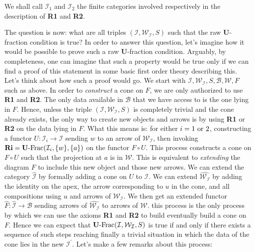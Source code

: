 \documentclass{article}
\numberwithin{equation}{section}
\theoremstyle{definition}
\theoremstyle{plain}
\begin{document}
We shall call $\mathcal{I}_1$ and $\mathcal{I}_2$ the finite categories involved respectively in the description of \textbf{R1} and \textbf{R2}.

The question is now: what are all triples $(\mathcal{I}, \mathcal{W}_{\mathcal{I}}, S)$ such that the raw \textbf{U}-fraction condition is true? In order to answer this question, let's imagine how it would be possible to prove such a raw \textbf{U}-fraction condition. Arguably, by completeness, one can imagine that such a property would be true only if we can find a proof of this statement in some basic first order theory describing this. Let's think about how such a proof would go. We start with $\mathcal{I}, \mathcal{W}_{\mathcal{I}}, S, \mathcal{B}, \mathcal{W}, F$ such as above. In order to \textit{construct} a cone on $F$, we are only authorized to use \textbf{R1} and \textbf{R2}. The only data available in $\mathcal{B}$ that we have access to is the one lying in $F$. Hence, unless the triple $(\mathcal{I}, \mathcal{W}_{\mathcal{I}}, S)$ is completely trivial and the cone already exists, the only way to create new objects and arrows is by using \textbf{R1} or \textbf{R2} on the data lying in $F$. What this means is: for either $i = 1 \textnormal{ or } 2$, constructing a functor $U:\mathcal{I}_i \to \mathcal{I}$ sending $w$ to an arrow of $\mathcal{W}_{\mathcal{I}}$, then invoking $\textbf{Ri}=\textnormal{\textbf{U}-Frac}(\mathcal{I}_i, \{w\}, \{a\})$ on the functor $F\circ U$. This process constructs a cone on $F\circ U$ such that the projection at $a$ is in $\mathcal{W}$. This is equivalent to \textit{extending} the diagram $F$ to include this new object and those new arrows. We can extend the category $\widehat{\mathcal{I}}$ by formally adding a cone on $U$ to $\mathcal{I}$. We can extend $\widehat{\mathcal{W}_{\mathcal{I}}}$ by adding the identity on the apex, the arrow corresponding to $u$ in the cone, and all compositions using $u$ and arrows of $\mathcal{W}_{\mathcal{I}}$. We then get an extended functor $\widehat{F}:\widehat{\mathcal{I}} \to\mathcal{B}$ sending arrows of $\widehat{\mathcal{W}_{\mathcal{I}}}$ to arrows of $\mathcal{W}$. this process is the only process by which we can use the axioms \textbf{R1} and \textbf{R2} to build eventually build a cone on $F$. Hence we can expect that $\textnormal{\textbf{U}-Frac}(\mathcal{I}, \mathcal{W}_{\mathcal{I}}, S)$ is true if and only if there exists a sequence of such steps reaching finally a trivial situation in which the data of the cone lies in the new $\mathcal{I}^{\prime}$. Let's make a few remarks about this process:
\end{document}

